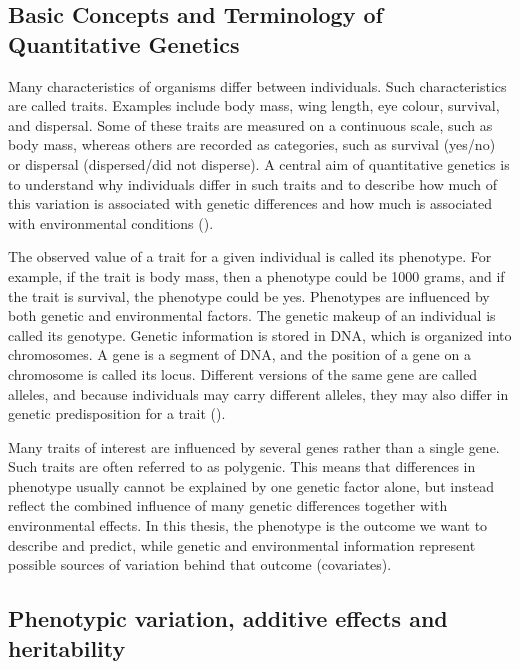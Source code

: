 \subsection{Basic Concepts and Terminology of Quantitative Genetics}

Many characteristics of organisms differ between individuals. Such characteristics are called traits. Examples include body mass, wing length, eye colour, survival, and dispersal. Some of these traits are measured on a continuous scale, such as body mass, whereas others are recorded as categories, such as survival (yes/no) or dispersal (dispersed/did not disperse). A central aim of quantitative genetics is to understand why individuals differ in such traits and to describe how much of this variation is associated with genetic differences and how much is associated with environmental conditions (\cite{falconer_introduction_1989}).

The observed value of a trait for a given individual is called its phenotype. For example, if the trait is body mass, then a phenotype could be 1000 grams, and if the trait is survival, the phenotype could be yes. Phenotypes are influenced by both genetic and environmental factors. The genetic makeup of an individual is called its genotype. Genetic information is stored in DNA, which is organized into chromosomes. A gene is a segment of DNA, and the position of a gene on a chromosome is called its locus. Different versions of the same gene are called alleles, and because individuals may carry different alleles, they may also differ in genetic predisposition for a trait (\cite{griffiths_introduction_2015}).

Many traits of interest are influenced by several genes rather than a single gene. Such traits are often referred to as polygenic. This means that differences in phenotype usually cannot be explained by one genetic factor alone, but instead reflect the combined influence of many genetic differences together with environmental effects. In this thesis, the phenotype is the outcome we want to describe and predict, while genetic and environmental information represent possible sources of variation behind that outcome (covariates). 


\subsection{Phenotypic variation, additive effects and heritability}

